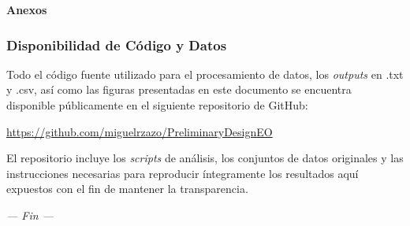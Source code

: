 \appendix

\clearpage
\thispagestyle{empty} 
\vspace*{\fill}
\begin{center}
    \Huge \textbf{Anexos}
\end{center}
\vspace*{\fill}
\clearpage


\hypersetup{hypertexnames=false}
\setcounter{page}{1}

\subsubsection{Disponibilidad de Código y Datos}
Todo el código fuente utilizado para el procesamiento de datos, los \textit{outputs} en .txt y .csv, así como las figuras presentadas en este documento se encuentra disponible públicamente en el siguiente repositorio de GitHub:

\begin{center}
    \url{https://github.com/miguelrzazo/PreliminaryDesignEO}
\end{center}

El repositorio incluye los \textit{scripts} de análisis, los conjuntos de datos originales y las instrucciones necesarias para reproducir íntegramente los resultados aquí expuestos con el fin de mantener la transparencia.

\newpage
\label{sec:annexdata}

\label{sec:annexcode}

\clearpage
\thispagestyle{empty}
\vspace*{\fill}
\begin{center}
    \textit{--- Fin ---}
\end{center}
\vspace*{\fill}

